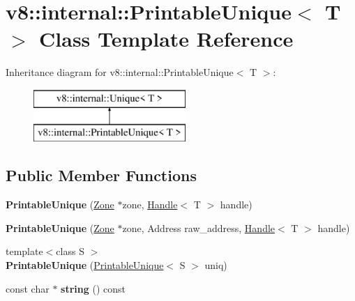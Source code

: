 \hypertarget{classv8_1_1internal_1_1_printable_unique}{}\section{v8\+:\+:internal\+:\+:Printable\+Unique$<$ T $>$ Class Template Reference}
\label{classv8_1_1internal_1_1_printable_unique}
Inheritance diagram for v8\+:\+:internal\+:\+:Printable\+Unique$<$ T $>$\+:\begin{figure}[H]
\begin{center}
\leavevmode
\includegraphics[height=2.000000cm]{classv8_1_1internal_1_1_printable_unique}
\end{center}
\end{figure}
\subsection*{Public Member Functions}
\begin{DoxyCompactItemize}
\item 
\hypertarget{classv8_1_1internal_1_1_printable_unique_a9931c90851206ec81fa1c1a76f92f435}{}{\bfseries Printable\+Unique} (\hyperlink{classv8_1_1internal_1_1_zone}{Zone} $\ast$zone, \hyperlink{classv8_1_1internal_1_1_handle}{Handle}$<$ T $>$ handle)\label{classv8_1_1internal_1_1_printable_unique_a9931c90851206ec81fa1c1a76f92f435}

\item 
\hypertarget{classv8_1_1internal_1_1_printable_unique_aa161bd22f97ebe0c1049894fd385e0cf}{}{\bfseries Printable\+Unique} (\hyperlink{classv8_1_1internal_1_1_zone}{Zone} $\ast$zone, Address raw\+\_\+address, \hyperlink{classv8_1_1internal_1_1_handle}{Handle}$<$ T $>$ handle)\label{classv8_1_1internal_1_1_printable_unique_aa161bd22f97ebe0c1049894fd385e0cf}

\item 
\hypertarget{classv8_1_1internal_1_1_printable_unique_af0ae93ac7e87ee56402892488fbe3256}{}{\footnotesize template$<$class S $>$ }\\{\bfseries Printable\+Unique} (\hyperlink{classv8_1_1internal_1_1_printable_unique}{Printable\+Unique}$<$ S $>$ uniq)\label{classv8_1_1internal_1_1_printable_unique_af0ae93ac7e87ee56402892488fbe3256}

\item 
\hypertarget{classv8_1_1internal_1_1_printable_unique_abb2a1a08055494b77bbdec8a3af16eb7}{}const char $\ast$ {\bfseries string} () const \label{classv8_1_1internal_1_1_printable_unique_abb2a1a08055494b77bbdec8a3af16eb7}

\end{DoxyCompactItemize}
